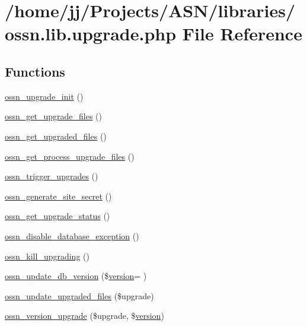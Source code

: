 \hypertarget{ossn_8lib_8upgrade_8php}{}\section{/home/jj/\+Projects/\+A\+S\+N/libraries/ossn.lib.\+upgrade.\+php File Reference}
\label{ossn_8lib_8upgrade_8php}
\subsection*{Functions}
\begin{DoxyCompactItemize}
\item 
\hyperlink{ossn_8lib_8upgrade_8php_a71027278c6c0c509f31824a6f3d470cf}{ossn\+\_\+upgrade\+\_\+init} ()
\item 
\hyperlink{ossn_8lib_8upgrade_8php_a415c3be955c0e349ad4824df543fa68c}{ossn\+\_\+get\+\_\+upgrade\+\_\+files} ()
\item 
\hyperlink{ossn_8lib_8upgrade_8php_a984d0f1ee4273d739939d28d00a8bedb}{ossn\+\_\+get\+\_\+upgraded\+\_\+files} ()
\item 
\hyperlink{ossn_8lib_8upgrade_8php_aa625710b5f23344c056483c8f0da599c}{ossn\+\_\+get\+\_\+process\+\_\+upgrade\+\_\+files} ()
\item 
\hyperlink{ossn_8lib_8upgrade_8php_abe956ece58bf8ca53575226e100e9c0f}{ossn\+\_\+trigger\+\_\+upgrades} ()
\item 
\hyperlink{ossn_8lib_8upgrade_8php_a0e9fc914b1cc3a0d955701c12b26a399}{ossn\+\_\+generate\+\_\+site\+\_\+secret} ()
\item 
\hyperlink{ossn_8lib_8upgrade_8php_abf16be31885d0f588a6fb9e6cffe46a1}{ossn\+\_\+get\+\_\+upgrade\+\_\+status} ()
\item 
\hyperlink{ossn_8lib_8upgrade_8php_ac5872f293941a3a3d3cab106b06f2c84}{ossn\+\_\+disable\+\_\+database\+\_\+exception} ()
\item 
\hyperlink{ossn_8lib_8upgrade_8php_a9360b173e2f7790cffa0b7b90b23a357}{ossn\+\_\+kill\+\_\+upgrading} ()
\item 
\hyperlink{ossn_8lib_8upgrade_8php_aa7120e10a9c14b722b0e25c99bc86d92}{ossn\+\_\+update\+\_\+db\+\_\+version} (\$\hyperlink{jquery-ui_8min_8js_a48872d9f9d392bdf4af857fe3e0ab638}{version}= \textquotesingle{}\textquotesingle{})
\item 
\hyperlink{ossn_8lib_8upgrade_8php_af5e235e44fa65a589d768b2693399250}{ossn\+\_\+update\+\_\+upgraded\+\_\+files} (\$upgrade)
\item 
\hyperlink{ossn_8lib_8upgrade_8php_a39390c32f8e878b292c7c1fae7d3ecb2}{ossn\+\_\+version\+\_\+upgrade} (\$upgrade, \$\hyperlink{jquery-ui_8min_8js_a48872d9f9d392bdf4af857fe3e0ab638}{version})
\end{DoxyCompactItemize}



